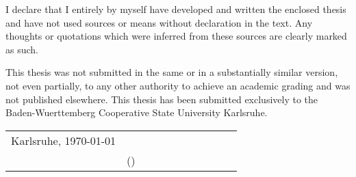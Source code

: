 
I declare that I entirely by myself have developed and written the enclosed thesis and have not used sources or means without declaration in the text. Any thoughts or quotations which were inferred from these sources are clearly marked as such.

This thesis was not submitted in the same or in a substantially similar version, not even partially, to any other authority to achieve an academic grading and was not published elsewhere. This thesis has been submitted exclusively to the Baden-Wuerttemberg Cooperative State University Karlsruhe.


\vspace{3cm}

\begin{tabular}{@{}p{0.5\linewidth} @{}p{0.5\linewidth}}
	Karlsruhe, \today \hfill & \hrulefill \\
	\hbox{} & (\myauthor) \\
\end{tabular}


